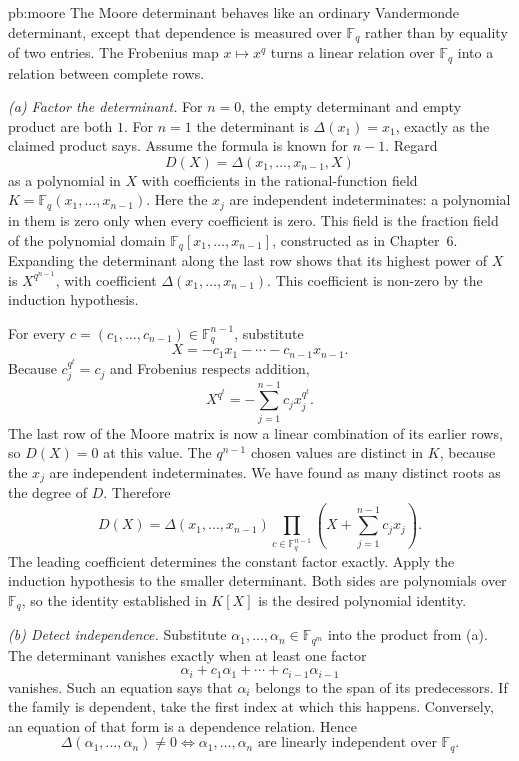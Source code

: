 \begin{solution}{pb:moore}
\idea The Moore determinant behaves like an ordinary Vandermonde determinant, except that dependence is measured over $\mathbb F_q$ rather than by equality of two entries. The Frobenius map $x\mapsto x^q$ turns a linear relation over $\mathbb F_q$ into a relation between complete rows.

\writeup \emph{(a) Factor the determinant.}
For $n=0$, the empty determinant and empty product are both $1$.
For $n=1$ the determinant is $\Delta(x_1)=x_1$, exactly as the claimed product says. Assume the formula is known for $n-1$. Regard
\[
D(X)=\Delta(x_1,\ldots,x_{n-1},X)
\]
as a polynomial in $X$ with coefficients in the rational-function field $K=\mathbb F_q(x_1,\ldots,x_{n-1})$. Here the $x_j$ are independent indeterminates: a polynomial in them is zero only when every coefficient is zero. This field is the fraction field of the polynomial domain $\mathbb F_q[x_1,\ldots,x_{n-1}]$, constructed as in Chapter~6. Expanding the determinant along the last row shows that its highest power of $X$ is $X^{q^{n-1}}$, with coefficient $\Delta(x_1,\ldots,x_{n-1})$. This coefficient is non-zero by the induction hypothesis.

For every $c=(c_1,\ldots,c_{n-1})\in\mathbb F_q^{n-1}$, substitute
\[
X=-c_1x_1-\cdots-c_{n-1}x_{n-1}.
\]
Because $c_j^{q^t}=c_j$ and Frobenius respects addition,
\[
X^{q^t}=-\sum_{j=1}^{n-1}c_jx_j^{q^t}.
\]
The last row of the Moore matrix is now a linear combination of its earlier rows, so $D(X)=0$ at this value. The $q^{n-1}$ chosen values are distinct in $K$, because the $x_j$ are independent indeterminates. We have found as many distinct roots as the degree of $D$. Therefore
\[
D(X)=\Delta(x_1,\ldots,x_{n-1})
\prod_{c\in\mathbb F_q^{n-1}}
\left(X+\sum_{j=1}^{n-1}c_jx_j\right).
\]
The leading coefficient determines the constant factor exactly. Apply the induction hypothesis to the smaller determinant. Both sides are polynomials over $\mathbb F_q$, so the identity established in $K[X]$ is the desired polynomial identity.

\emph{(b) Detect independence.}
Substitute $\alpha_1,\ldots,\alpha_n\in\mathbb F_{q^m}$ into the product from (a). The determinant vanishes exactly when at least one factor
\[
\alpha_i+c_1\alpha_1+\cdots+c_{i-1}\alpha_{i-1}
\]
vanishes. Such an equation says that $\alpha_i$ belongs to the span of its predecessors. If the family is dependent, take the first index at which this happens. Conversely, an equation of that form is a dependence relation. Hence
\[
\boxed{\Delta(\alpha_1,\ldots,\alpha_n)\ne0
\iff \alpha_1,\ldots,\alpha_n
\text{ are linearly independent over }\mathbb F_q.}
\]


\end{solution}
